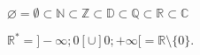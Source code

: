 $\varnothing = \emptyset \subset \mathds N \subset \mathds Z \subset
\mathds D \subset \mathds Q\subset \mathds R \subset \mathds C$ \medskip

$\mathds R^*=]-\infty ; 0[ \cup ]0 ; +\infty[ = \mathds R \setminus \{0\}$.